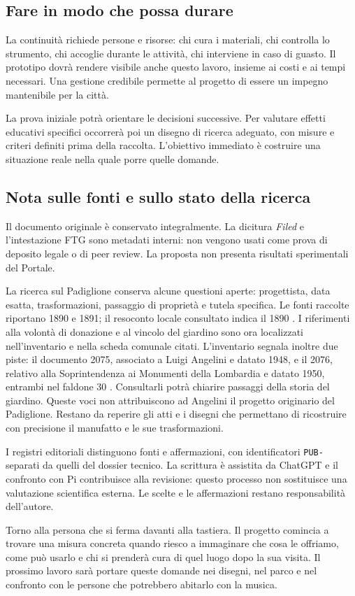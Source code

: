 \subsection{Fare in modo che possa durare}
La continuità richiede persone e risorse: chi cura
i materiali, chi controlla lo strumento, chi accoglie
durante le attività, chi interviene in caso di guasto.
Il prototipo dovrà rendere visibile anche questo
lavoro, insieme ai costi e ai tempi necessari.
Una gestione credibile permette al progetto di
essere un impegno mantenibile per la città.

La prova iniziale potrà orientare le decisioni
successive. Per valutare effetti educativi specifici
occorrerà poi un disegno di ricerca adeguato, con
misure e criteri definiti prima della raccolta.
L'obiettivo immediato è costruire una situazione
reale nella quale porre quelle domande.

\subsection{Nota sulle fonti e sullo stato della ricerca}
Il documento originale è conservato integralmente.
La dicitura \emph{Filed} e l'intestazione FTG sono
metadati interni: non vengono usati come prova di
deposito legale o di peer review. La proposta non
presenta risultati sperimentali del Portale.

La ricerca sul Padiglione conserva alcune questioni
aperte: progettista, data esatta, trasformazioni,
passaggio di proprietà e tutela specifica. Le fonti
raccolte riportano 1890 e 1891; il resoconto locale
consultato indica il 1890 \cite{primabergamo2024}.
I riferimenti alla volontà di donazione e al vincolo del giardino
sono ora localizzati nell'inventario e nella scheda comunale citati.
L'inventario segnala inoltre due piste: il documento 2075, associato
a Luigi Angelini e datato 1948, e il 2076, relativo alla Soprintendenza
ai Monumenti della Lombardia e datato 1950, entrambi nel faldone 30
\cite[p.~65 PDF]{mai_inventario}. Consultarli potrà chiarire
passaggi della storia del giardino. Queste voci non attribuiscono
ad Angelini il progetto originario del Padiglione.
Restano da reperire gli atti e i disegni che permettano di ricostruire
con precisione il manufatto e le sue trasformazioni.

I registri editoriali distinguono fonti e affermazioni,
con identificatori \texttt{PUB-} separati da quelli
del dossier tecnico. La scrittura è assistita da
ChatGPT e il confronto con Pi contribuisce alla
revisione: questo processo non sostituisce una
valutazione scientifica esterna. Le scelte e le
affermazioni restano responsabilità dell'autore.

Torno alla persona che si ferma davanti alla
tastiera. Il progetto comincia a trovare una
misura concreta quando riesco a immaginare che
cosa le offriamo, come può usarlo e chi si
prenderà cura di quel luogo dopo la sua visita.
Il prossimo lavoro sarà portare queste domande
nei disegni, nel parco e nel confronto con le
persone che potrebbero abitarlo con la musica.


